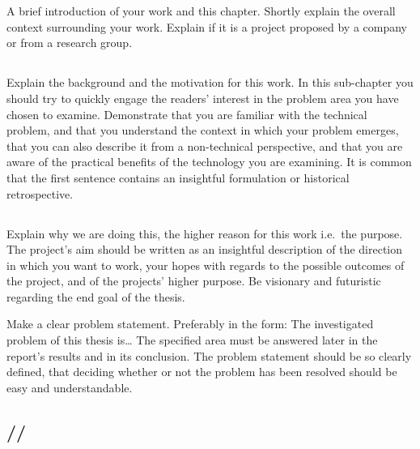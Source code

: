 \section{}\label{sec:intro} 
A brief introduction of your work and this chapter. Shortly explain the overall context surrounding
your work. Explain if it is a project proposed by a company or from a research group.

\subsection{}\label{subsec:background}
\noindent 
Explain the background and the motivation for this work. In this sub-chapter you should try to
quickly engage the readers' interest in the problem area you have chosen to examine. Demonstrate
that you are familiar with the technical problem, and that you understand the context in which your
problem emerges, that you can also describe it from a non-technical perspective, and that you are
aware of the practical benefits of the technology you are examining. It is common that the first
sentence contains an insightful formulation or historical retrospective.  

\subsection{}\label{subsec:aim}
\noindent
Explain why we are doing this, the higher reason for this work i.e.\ the purpose. The project's aim
should be written as an insightful description of the direction in which you want to work, your
hopes with regards to the possible outcomes of the project, and of the projects' higher purpose. Be
visionary and futuristic regarding the end goal of the thesis.

Make a clear problem statement.  Preferably in the form: The investigated problem of this thesis is…
The specified area must be answered later in the report's results and in its conclusion. The problem
statement should be so clearly defined, that deciding whether or not the problem has been resolved
should be easy and understandable.

\subsection{//}\label{subsec:researchquestion}

